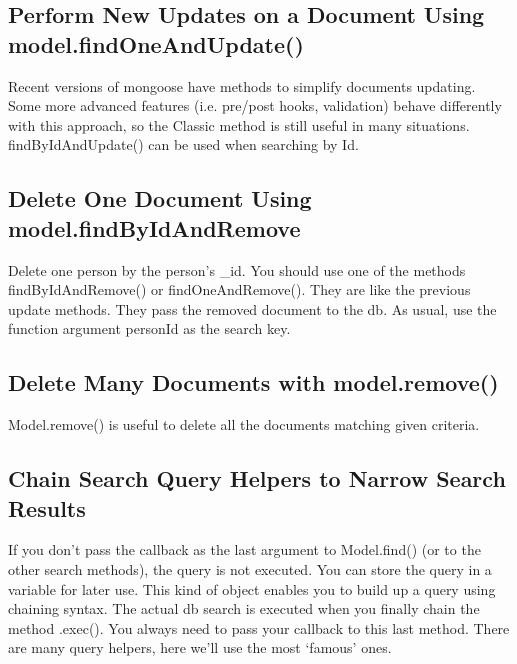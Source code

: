 \documentclass{article}%
\begin{document}
%
\subsection{Perform New Updates on a Document Using model.findOneAndUpdate()}%
\label{subsec:PerformNewUpdatesonaDocumentUsingmodel.findOneAndUpdate()}%
Recent versions of mongoose have methods to simplify documents updating. Some more advanced features (i.e. pre/post hooks, validation) behave differently with this approach, so the Classic method is still useful in many situations. findByIdAndUpdate() can be used when searching by Id.\newline%

%
\subsection{Delete One Document Using model.findByIdAndRemove}%
\label{subsec:DeleteOneDocumentUsingmodel.findByIdAndRemove}%
Delete one person by the person's \_id. You should use one of the methods findByIdAndRemove() or findOneAndRemove(). They are like the previous update methods. They pass the removed document to the db. As usual, use the function argument personId as the search key.\newline%

%
\subsection{Delete Many Documents with model.remove()}%
\label{subsec:DeleteManyDocumentswithmodel.remove()}%
Model.remove() is useful to delete all the documents matching given criteria. \newline%

%
\subsection{Chain Search Query Helpers to Narrow Search Results}%
\label{subsec:ChainSearchQueryHelperstoNarrowSearchResults}%
If you don’t pass the callback as the last argument to Model.find() (or to the other search methods), the query is not executed. You can store the query in a variable for later use. This kind of object enables you to build up a query using chaining syntax. The actual db search is executed when you finally chain the method .exec(). You always need to pass your callback to this last method. There are many query helpers, here we’ll use the most ‘famous’ ones.\newline%
\end{document}
